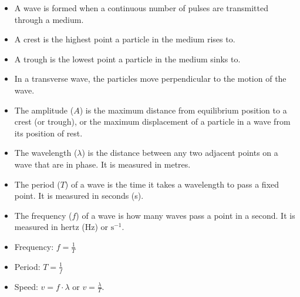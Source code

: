             \nopagebreak
      \label{m38806*id324089}\begin{itemize}[noitemsep] 
            \label{m38806*uid108}\item A wave is formed when a continuous number of pulses are transmitted through a medium.
\label{m38806*uid109}\item A crest is the highest point a particle in the medium rises to.
\label{m38806*uid110}\item A trough is the lowest point a particle in the medium sinks to.
\label{m38806*uid111}\item In a transverse wave, the particles move perpendicular to the motion of the wave.
\label{m38806*uid112}\item The amplitude ($A$) is the maximum distance from equilibrium position to a crest (or trough), or the maximum displacement of a particle in a wave from its position of rest.
\label{m38806*uid113}\item The wavelength ($\lambda $) is the distance between any two adjacent points on a wave that are in phase. It is measured in metres.
\label{m38806*uid114}\item The period ($T$) of a wave is the time it takes a wavelength to pass a fixed point. It is measured in seconds (s).
\label{m38806*uid115}\item The frequency ($f$) of a wave is how many waves pass a point in a second. It is measured in hertz (Hz) or $\text{s}{}^{-1}$.
\label{m38806*uid116}\item Frequency: $f=\frac{1}{T}$\label{m38806*uid117}\item Period: $T=\frac{1}{f}$\label{m38806*uid118}\item Speed: $v=f\cdot\lambda $ or $v=\frac{\lambda }{T}$.
\end{itemize}
